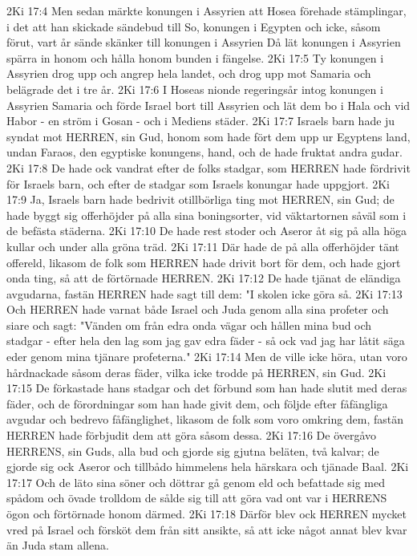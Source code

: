 2Ki 17:4  Men sedan märkte konungen i Assyrien att Hosea förehade stämplingar, i det att han skickade sändebud till So, konungen i Egypten och icke, såsom förut, vart år sände skänker till konungen i Assyrien Då lät konungen i Assyrien spärra in honom och hålla honom bunden i fängelse.
2Ki 17:5  Ty konungen i Assyrien drog upp och angrep hela landet, och drog upp mot Samaria och belägrade det i tre år.
2Ki 17:6  I Hoseas nionde regeringsår intog konungen i Assyrien Samaria och förde Israel bort till Assyrien och lät dem bo i Hala och vid Habor - en ström i Gosan - och i Mediens städer.
2Ki 17:7  Israels barn hade ju syndat mot HERREN, sin Gud, honom som hade fört dem upp ur Egyptens land, undan Faraos, den egyptiske konungens, hand, och de hade fruktat andra gudar.
2Ki 17:8  De hade ock vandrat efter de folks stadgar, som HERREN hade fördrivit för Israels barn, och efter de stadgar som Israels konungar hade uppgjort.
2Ki 17:9  Ja, Israels barn hade bedrivit otillbörliga ting mot HERREN, sin Gud; de hade byggt sig offerhöjder på alla sina boningsorter, vid väktartornen såväl som i de befästa städerna.
2Ki 17:10  De hade rest stoder och Aseror åt sig på alla höga kullar och under alla gröna träd.
2Ki 17:11  Där hade de på alla offerhöjder tänt offereld, likasom de folk som HERREN hade drivit bort för dem, och hade gjort onda ting, så att de förtörnade HERREN.
2Ki 17:12  De hade tjänat de eländiga avgudarna, fastän HERREN hade sagt till dem: "I skolen icke göra så.
2Ki 17:13  Och HERREN hade varnat både Israel och Juda genom alla sina profeter och siare och sagt: "Vänden om från edra onda vägar och hållen mina bud och stadgar - efter hela den lag som jag gav edra fäder - så ock vad jag har låtit säga eder genom mina tjänare profeterna."
2Ki 17:14  Men de ville icke höra, utan voro hårdnackade såsom deras fäder, vilka icke trodde på HERREN, sin Gud.
2Ki 17:15  De förkastade hans stadgar och det förbund som han hade slutit med deras fäder, och de förordningar som han hade givit dem, och följde efter fåfängliga avgudar och bedrevo fåfänglighet, likasom de folk som voro omkring dem, fastän HERREN hade förbjudit dem att göra såsom dessa.
2Ki 17:16  De övergåvo HERRENS, sin Guds, alla bud och gjorde sig gjutna beläten, två kalvar; de gjorde sig ock Aseror och tillbådo himmelens hela härskara och tjänade Baal.
2Ki 17:17  Och de läto sina söner och döttrar gå genom eld och befattade sig med spådom och övade trolldom de sålde sig till att göra vad ont var i HERRENS ögon och förtörnade honom därmed.
2Ki 17:18  Därför blev ock HERREN mycket vred på Israel och försköt dem från sitt ansikte, så att icke något annat blev kvar än Juda stam allena.
